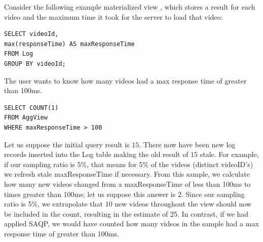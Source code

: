 Consider the following example materialized view \aggview, which stores a result for each video and the maximum time it took for the server to load that video:
\begin{lstlisting} 
SELECT videoId, 
max(responseTime) AS maxResponseTime 
FROM Log 
GROUP BY videoId;
\end{lstlisting}

The user wants to know how many videos had a max response time of greater than 100ms.
\begin{lstlisting} 
SELECT COUNT(1)
FROM AggView
WHERE maxResponseTime > 100
\end{lstlisting}
Let us suppose the initial query result is $15$.
There now have been new log records inserted into the Log table making the old result of $15$ stale.
For example, if our sampling ratio is 5\%, that means for 5\% of the videos (distinct videoID's) we refresh stale maxResponseTime if necessary.
From this sample, we calculate how many new videos changed from a maxResponseTime of less than 100ms to times greater than 100ms; let us suppose this answer is $2$.
Since our sampling ratio is 5\%, we extrapolate that $10$ new videos throughout the view should now be included in the count, resulting in the estimate of $25$.
In contrast, if we had applied SAQP, we would have counted how many videos in the sample had a max response time of greater than 100ms.